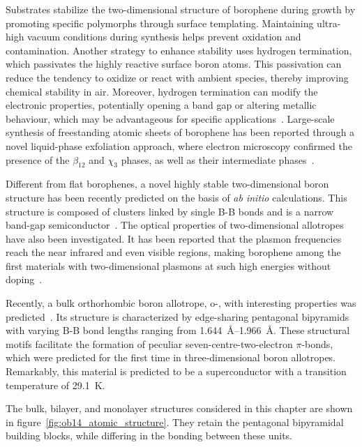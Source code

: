 Substrates stabilize the two-dimensional structure of borophene during growth by promoting specific polymorphs through surface templating.
Maintaining ultra-high vacuum conditions during synthesis helps prevent oxidation and contamination.
Another strategy to enhance stability uses hydrogen termination,
which passivates the highly reactive surface boron atoms.
This passivation can reduce the tendency to oxidize or react with ambient species,
thereby improving chemical stability in air.
Moreover, hydrogen termination can modify the electronic properties,
potentially opening a band gap or altering metallic behaviour,
which may be advantageous for specific applications~\cite{hou2020ultrastable,li2021synthesis}.
Large-scale synthesis of freestanding atomic sheets of borophene has been reported through a novel liquid-phase exfoliation approach,
where electron microscopy confirmed the presence of the $\beta_{12}$ and $\chi_{3}$ phases,
as well as their intermediate phases~\cite{ranjan2019freestanding}.

Different from flat borophenes,
a novel highly stable two-dimensional boron structure has been recently predicted on the basis of \textit{ab initio} calculations.
This structure is composed of  clusters linked by single B-B bonds and is a narrow band-gap semiconductor~\cite{zhang2023novel}.
The optical properties of two-dimensional allotropes have also been investigated.
It has been reported that the plasmon frequencies reach the near infrared and even visible regions,
making borophene among the first materials with two-dimensional plasmons at such high energies without doping~\cite{huang2017}.

Recently, a bulk orthorhombic boron allotrope, o-,
with interesting properties was predicted~\cite{han2023superconducting}.
Its structure is characterized by edge-sharing pentagonal bipyramids with varying B-B bond lengths ranging from \qtyrange{1.644}{1.966}{\angstrom}.
These structural motifs facilitate the formation of peculiar seven-centre-two-electron $\pi$-bonds,
which were predicted for the first time in three-dimensional boron allotropes.
Remarkably, this material is predicted to be a superconductor with a transition temperature of \qty{29.1}{K}.

The bulk, bilayer, and monolayer structures considered in this chapter are shown in figure~\ref{fig:ob14_atomic_structure}.
They retain the pentagonal bipyramidal building blocks,
while differing in the bonding between these units.

